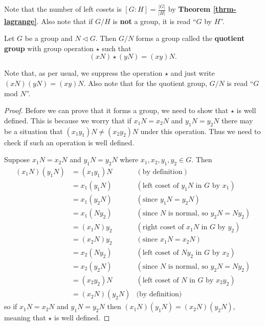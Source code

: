 Note that the number of left cosets is $[G:H] = \frac{|G|}{|H|}$ by \textbf{Theorem \ref{thrm-lagrange}}. Also note that if $G/H$ is \textbf{not} a group, it is read ``$G$ by $H$''.

\begin{theorem}\label{thrm-quotient-group-requirement}
    Let $G$ be a group and $N \lhd G$. Then $G / N$ forms a group called the \textbf{quotient group} with group operation $\star$ such that
    \[
        (xN) \star (yN) = (xy)N.
    \]
\end{theorem}
Note that, as per usual, we suppress the operation $\star$ and just write $(xN)(yN) = (xy)N$. Also note that for the quotient group, $G / N$ is read ``$G$ mod $N$''.
\begin{proof}
    Before we can prove that it forms a group, we need to show that $\star$ is well defined. This is because we worry that if $x_1N = x_2N$ and $y_1N = y_2N$ there may be a situation that $(x_1y_1)N \neq (x_2y_2)N$ under this operation. Thus we need to check if such an operation is well defined.

    Suppose $x_1N = x_2N$ and $y_1N = y_2N$ where $x_1, x_2, y_1, y_2 \in G$. Then
    \begin{align*}
        (x_1N)(y_1N) &= (x_1y_1)N & (\text{by definition})\\
        &= x_1(y_1N) & (\text{left coset of } y_1N \text{ in } G \text{ by } x_1)\\
        &= x_1(y_2N) & (\text{since } y_1N = y_2N)\\
        &= x_1(Ny_2) & (\text{since } N \text{ is normal, so } y_2N=Ny_2)\\
        &= (x_1N)y_2 & (\text{right coset of } x_1N \text{ in } G \text{ by } y_2)\\
        &= (x_2N)y_2 & (\text{since } x_1N = x_2N)\\
        &= x_2(Ny_2) & (\text{left coset of } Ny_2 \text{ in } G \text{ by } x_2)\\
        &= x_2(y_2N) & (\text{since } N \text{ is normal, so } y_2N=Ny_2)\\
        &= (x_2y_2)N & (\text{left coset of } N \text{ in } G \text{ by } x_2y_2)\\
        &= (x_2N)(y_2N) & \text{(by definition)}
    \end{align*}
    so if $x_1N = x_2N$ and $y_1N = y_2N$ then $(x_1N)(y_1N) = (x_2N)(y_2N)$, meaning that $\star$ is well defined.


\end{proof}

